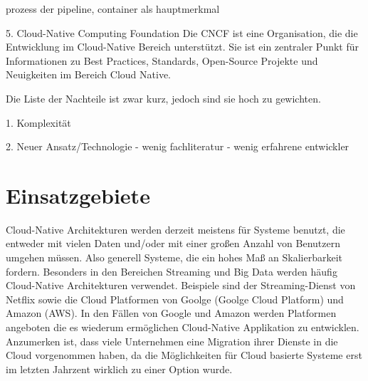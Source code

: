 prozess der pipeline, container als hauptmerkmal

5. Cloud-Native Computing Foundation
Die CNCF ist eine Organisation, die die Entwicklung im Cloud-Native Bereich unterstützt. Sie ist ein zentraler Punkt für Informationen zu Best Practices, Standards, Open-Source Projekte und Neuigkeiten im Bereich Cloud Native.

Die Liste der Nachteile ist zwar kurz, jedoch sind sie hoch zu gewichten.

1. Komplexität


2. Neuer Ansatz/Technologie
- wenig fachliteratur
- wenig erfahrene entwickler


\section{Einsatzgebiete}
Cloud-Native Architekturen werden derzeit meistens für Systeme benutzt, die entweder mit vielen Daten und/oder mit einer großen Anzahl von Benutzern umgehen müssen. Also generell Systeme, die ein hohes Maß an Skalierbarkeit fordern. Besonders in den Bereichen Streaming und Big Data werden häufig Cloud-Native Architekturen verwendet. 
Beispiele sind der Streaming-Dienst von Netflix sowie die Cloud Platformen von Goolge (Goolge Cloud Platform) und Amazon (AWS). In den Fällen von Google und Amazon werden Platformen angeboten die es wiederum ermöglichen Cloud-Native Applikation zu entwicklen.
Anzumerken ist, dass viele Unternehmen eine Migration ihrer Dienste in die Cloud vorgenommen haben, da die Möglichkeiten für Cloud basierte Systeme erst im letzten Jahrzent wirklich zu einer Option wurde. 